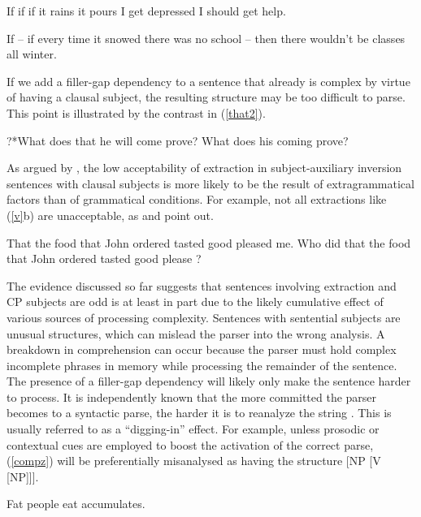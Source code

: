 \documentclass[output=paper]{langsci/langscibook}
\begin{document}
\ea
\ea If if if it rains it pours I get depressed I should get help.

\ex If -- if every time it snowed there was no school -- then there wouldn't be classes all winter.
\z \label{pinker}
\z

  
  
  
  If we add a filler-gap dependency to a sentence that already is complex by
  virtue of having  a clausal  subject, the resulting structure
  may be too difficult to parse.  This   point is illustrated by
  the contrast in (\ref{that2}).



\ea
\ea ?*What does that he will come prove?
\ex What does his coming  prove?\\
\citep{lewis93}
\z \label{that2}
\z


\noindent
As argued by \citet{dubinsky2009}, the low acceptability
 of extraction in subject-auxiliary inversion sentences with clausal subjects 
  is more likely to be the result of extragrammatical factors than of grammatical conditions.
For example,  not all extractions like (\ref{v}b) are unacceptable, as
\citet[382--387]{delahunty} and
\citet[115]{dubinsky2009} point out. 

\ea
\ea That the food that John ordered tasted good pleased me.
\ex \bad{*}Who did that the food that John ordered tasted good please \spcs?
\z \label{v}
\z

The evidence discussed so far suggests that  sentences involving extraction and CP subjects  are odd 
is at least in part due to the likely cumulative effect of   various sources of  processing complexity. 
Sentences with sentential subjects are unusual structures, which can 
mislead the parser into the wrong analysis. A  breakdown in comprehension can occur
because the parser must hold complex incomplete phrases in memory
while processing the remainder of the sentence. The presence of a filler-gap dependency
will likely only make the sentence harder to process. 
It is independently known that the  more committed the parser 
becomes to a syntactic parse, the  harder it is to reanalyze the 
string \citep{ferreirahend,ferreirahend2,tabor3}.
This is usually referred to as a ``digging-in'' effect.
For example, unless prosodic or contextual cues  are employed to
boost the activation  of the correct  parse,   (\ref{compz}) will 
be preferentially  misanalysed as having the structure [NP [V [NP]]].

\ea Fat people eat accumulates.
\z \label{compz}
\end{document}
